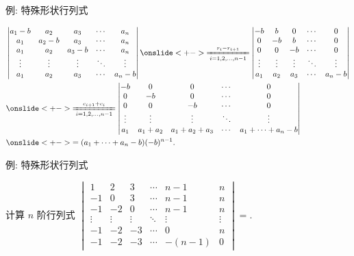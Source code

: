 \begin{frame}{例: 特殊形状行列式}
	\onslide<+->
	\begin{example}
		\begin{align*}
		&\begin{vmatrix}
			a_1-b&a_2&a_3&\cdots&a_n\\
			a_1&a_2-b&a_3&\cdots&a_n\\
			a_1&a_2&a_3-b&\cdots&a_n\\
			\vdots&\vdots&\vdots&\ddots&\vdots\\
			a_1&a_2&a_3&\cdots&a_n-b
		\end{vmatrix}
		\onslide<+->{\xeq[i=1,2,\dots,n-1]{r_i-r_{i+1}}
		\begin{vmatrix}
			-b& b& 0&\cdots&0\\
			 0&-b& b&\cdots&0\\
			 0& 0&-b&\cdots&0\\
			\vdots&\vdots&\vdots&\ddots&\vdots\\
			a_1&a_2&a_3&\cdots&a_n-b
		\end{vmatrix}}\\
		&\onslide<+->{\xeq[i=1,2,\dots,n-1]{c_{i+1}+c_i}
		\begin{vmatrix}
			-b& 0& 0&\cdots&0\\
			 0&-b& 0&\cdots&0\\
			 0& 0&-b&\cdots&0\\
			\vdots&\vdots&\vdots&\ddots&\vdots\\
			a_1&a_1+a_2&a_1+a_2+a_3&\cdots&a_1+\cdots+a_n-b
		\end{vmatrix}}\\
		&\onslide<+->{=(a_1+\cdots+a_n-b)(-b)^{n-1}.}
	\end{align*}
	\end{example}
\end{frame}


\begin{frame}{例: 特殊形状行列式}
	\onslide<+->
	\begin{exercise}
		计算 $n$ 阶行列式 $\begin{vmatrix}
			1&2&3&\cdots&n-1&n\\
			-1&0&3&\cdots&n-1&n\\
			-1&-2&0&\cdots&n-1&n\\
			\vdots&\vdots&\vdots&\ddots&\vdots&\vdots\\
			-1&-2&-3&\cdots&0&n\\
			-1&-2&-3&\cdots&-(n-1)&0
		\end{vmatrix}=$.
	\end{exercise}
\end{frame}


